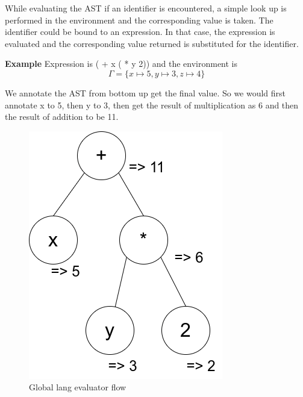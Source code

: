     While evaluating the AST if an identifier is encountered, a simple look up is performed in the environment and the corresponding value is taken. The identifier could be bound to an expression. In that case, the expression is evaluated and the corresponding value returned is substituted for the identifier.

    \textbf{Example}
    Expression is ( + x ( * y 2)) and the environment is 
    $$\Gamma = \{ x \mapsto 5, y \mapsto 3, z \mapsto 4\}$$

    We annotate the AST from bottom up get the final value. So we would first annotate x to 5, then y to 3, then get the result of multiplication as 6 and then the result of addition to be 11.

    \begin{figure}[htbp]
        \center
        \includegraphics[scale=0.6]{images/lecture7/global_ex_ast.png}
        \caption{Global lang evaluator flow}
    \end{figure}
